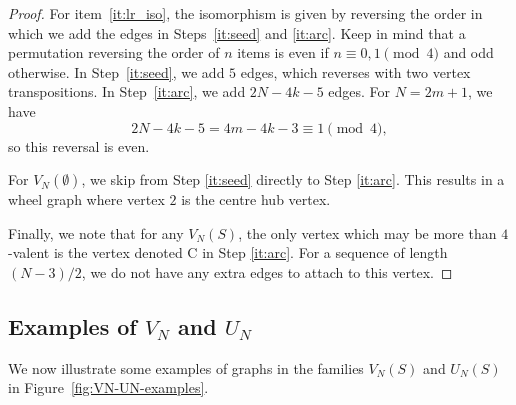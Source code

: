 \documentclass[11pt]{article}
\theoremstyle{definition}
\theoremstyle{plain}
\begin{document}
\begin{proof}


For item~\ref{it:lr_iso}, the isomorphism is given by reversing the order in which we add the edges in Steps~\ref{it:seed} and \ref{it:arc}. Keep in mind that a permutation reversing the order of $n$ items is even if $n \equiv 0,1 \pmod{4}$ and odd otherwise.
In Step~\ref{it:seed}, we add $5$ edges, which reverses with two vertex transpositions.
In Step~\ref{it:arc}, we add $2N-4k-5$ edges. For $N=2m+1$, we have
\[
2N-4k-5 = 4m-4k-3 \equiv 1 \pmod{4},
\]
so this reversal is even.
 
For $V_N(\emptyset)$, we skip from Step \ref{it:seed} directly to Step \ref{it:arc}. This results in a wheel graph where vertex $2$ is the centre hub vertex. 

Finally, we note that for any $V_N(S)$, the only vertex which may be more than $4$-valent is the vertex denoted C in Step \ref{it:arc}.
For a sequence of length $(N-3)/2$, we do not have any extra edges to attach to this vertex. 


\end{proof}

\subsection*{Examples of $V_N$ and $U_N$}

We now illustrate some examples of graphs in the families $V_N(S)$ and $U_N(S)$ in Figure~\ref{fig:VN-UN-examples}.
\end{document}
